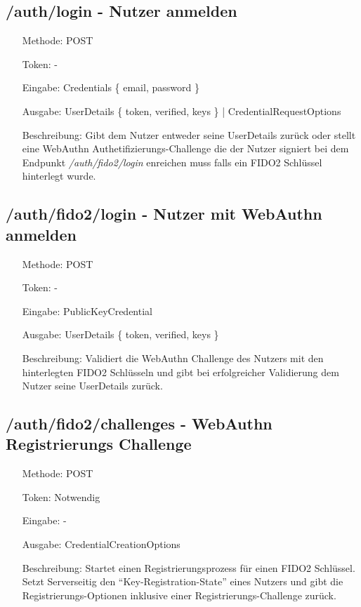 \documentclass[journal]{IEEEtran}
\begin{document}
\subsection{/auth/login - Nutzer anmelden}

\begin{itemize}
	\setlength{\leftskip}{1.5cm}
	\setlength{\itemsep}{0pt}
	\item[Methode:] POST
	\item[Token:] -
	\item[Eingabe:] Credentials \{ email, password \}
	\item[Ausgabe:] UserDetails \{ token, verified, keys \} | CredentialRequestOptions 
	\item[Beschreibung:] Gibt dem Nutzer entweder seine UserDetails zurück oder
		stellt eine WebAuthn Authetifizierungs-Challenge die der Nutzer
		signiert bei dem Endpunkt \textit{/auth/fido2/login} enreichen muss
		falls ein FIDO2 Schlüssel hinterlegt wurde.
\end{itemize}

\subsection{/auth/fido2/login - Nutzer mit WebAuthn anmelden}

\begin{itemize}
	\setlength{\leftskip}{1.5cm}
	\setlength{\itemsep}{0pt}
	\item[Methode:] POST
	\item[Token:] -
	\item[Eingabe:] PublicKeyCredential
	\item[Ausgabe:] UserDetails \{ token, verified, keys \}
	\item[Beschreibung:] Validiert die WebAuthn Challenge des Nutzers mit den
		hinterlegten FIDO2 Schlüsseln und gibt bei erfolgreicher Validierung
		dem Nutzer seine UserDetails zurück.
\end{itemize}

\subsection{/auth/fido2/challenges - WebAuthn Registrierungs Challenge}

\begin{itemize}
	\setlength{\leftskip}{1.5cm}
	\setlength{\itemsep}{0pt}
	\item[Methode:] POST
	\item[Token:] Notwendig
	\item[Eingabe:] -
	\item[Ausgabe:] CredentialCreationOptions 
	\item[Beschreibung:] Startet einen Registrierungsprozess für einen FIDO2
		Schlüssel. Setzt Serverseitig den ``Key-Registration-State'' eines
		Nutzers und gibt die Registrierungs-Optionen inklusive einer
		Registrierungs-Challenge zurück.
\end{itemize}
\end{document}
